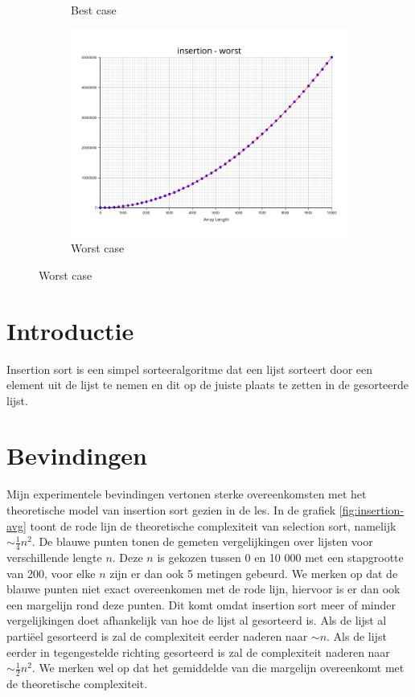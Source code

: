 \documentclass[a4paper]{article}
\begin{document}
\begin{figure}[h]
\begin{subfigure}[b]{0.3\textwidth}
    \caption{Best case}
    \label{fig:insertion-best}
  \end{subfigure}\hfill
  \begin{subfigure}[b]{0.3\textwidth}
    \includegraphics[width=\textwidth]{../plots/insertion-worst.png}
    \caption{Worst case}
    \label{fig:insertion-worst}
  \end{subfigure}
\end{figure}

\section{Introductie}

Insertion sort is een simpel sorteeralgoritme dat een lijst sorteert door een element uit de lijst te nemen en dit op de juiste plaats te zetten in de gesorteerde lijst.

\section{Bevindingen}
Mijn experimentele bevindingen vertonen sterke overeenkomsten met het theoretische model van insertion sort gezien in de les.
In de grafiek \ref{fig:insertion-avg} toont de rode lijn de theoretische complexiteit van selection sort, namelijk $\sim \frac{1}{4} n^2$. 
De blauwe punten tonen de gemeten vergelijkingen over lijsten voor verschillende lengte $n$. 
Deze $n$ is gekozen tussen 0 en 10 000 met een stapgrootte van 200, voor elke $n$ zijn er dan ook 5 metingen gebeurd. We merken op dat
de blauwe punten niet exact overeenkomen met de rode lijn, hiervoor is er dan ook een margelijn rond deze punten. Dit komt omdat insertion sort meer of minder vergelijkingen doet
afhankelijk van hoe de lijst al gesorteerd is. Als de lijst al partiëel gesorteerd is zal de complexiteit eerder naderen naar $\sim n$.
Als de lijst eerder in tegengestelde richting gesorteerd is zal de complexiteit naderen naar $\sim \frac{1}{2}n^2$. We merken wel op dat
het gemiddelde van die margelijn overeenkomt met de theoretische complexiteit.
\end{document}
